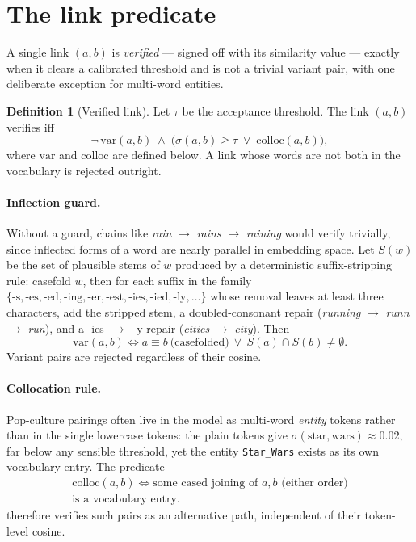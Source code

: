 \documentclass[11pt]{article}
\theoremstyle{definition}
\newtheorem{definition}{Definition}
\newcommand{\cosim}{\sigma}
\newcommand{\thresh}{\tau}
\begin{document}
\section{The link predicate}

A single link $(a, b)$ is \emph{verified} --- signed off with its similarity
value --- exactly when it clears a calibrated threshold and is not a trivial
variant pair, with one deliberate exception for multi-word entities.

\begin{definition}[Verified link]
\label{def:link}
Let $\thresh$ be the acceptance threshold. The link $(a,b)$ verifies iff
\[
  \neg\,\mathrm{var}(a, b)
  \;\wedge\;
  \bigl( \cosim(a, b) \ge \thresh \;\vee\; \mathrm{colloc}(a, b) \bigr),
\]
where $\mathrm{var}$ and $\mathrm{colloc}$ are defined below. A link whose
words are not both in the vocabulary is rejected outright.
\end{definition}

\paragraph{Inflection guard.}
Without a guard, chains like \emph{rain} $\to$ \emph{rains} $\to$
\emph{raining} would verify trivially, since inflected forms of a word are
nearly parallel in embedding space. Let $S(w)$ be the set of plausible stems of
$w$ produced by a deterministic suffix-stripping rule: casefold $w$, then for
each suffix in the family
$\{\text{-s}, \text{-es}, \text{-ed}, \text{-ing}, \text{-er}, \text{-est},
\text{-ies}, \text{-ied}, \text{-ly}, \dots\}$
whose removal leaves at least three characters, add the stripped stem, a
doubled-consonant repair (\emph{running} $\to$ \emph{runn} $\to$ \emph{run}),
and a \mbox{-ies $\to$ -y} repair (\emph{cities} $\to$ \emph{city}). Then
\[
  \mathrm{var}(a, b) \iff
  a \equiv b \ \text{(casefolded)} \ \vee\ S(a) \cap S(b) \neq \emptyset .
\]
Variant pairs are rejected regardless of their cosine.

\paragraph{Collocation rule.}
Pop-culture pairings often live in the model as multi-word \emph{entity}
tokens rather than in the single lowercase tokens: the plain tokens give
$\cosim(\text{star}, \text{wars}) \approx 0.02$, far below any sensible
threshold, yet the entity \texttt{Star\_Wars} exists as its own vocabulary
entry. The predicate
\begin{gather*}
  \mathrm{colloc}(a, b) \iff
  \text{some cased joining of $a, b$ (either order)} \\
  \text{is a vocabulary entry.}
\end{gather*}
therefore verifies such pairs as an alternative path, independent of their
token-level cosine.
\end{document}
